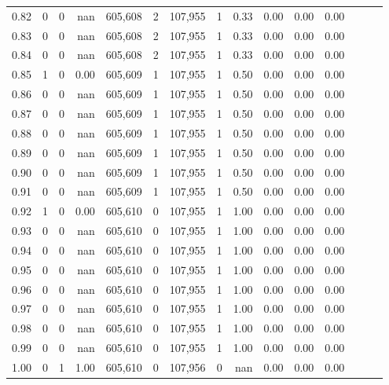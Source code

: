 \begin{tabular}{rrrrrrrrrrrrrrr}
0.82 &        0 &       0 &   nan &  605,608 &        2 &  107,955 &        1 &  0.33 &  0.00 &  0.00 &      0.00 \\
0.83 &        0 &       0 &   nan &  605,608 &        2 &  107,955 &        1 &  0.33 &  0.00 &  0.00 &      0.00 \\
0.84 &        0 &       0 &   nan &  605,608 &        2 &  107,955 &        1 &  0.33 &  0.00 &  0.00 &      0.00 \\
0.85 &        1 &       0 &  0.00 &  605,609 &        1 &  107,955 &        1 &  0.50 &  0.00 &  0.00 &      0.00 \\
0.86 &        0 &       0 &   nan &  605,609 &        1 &  107,955 &        1 &  0.50 &  0.00 &  0.00 &      0.00 \\
0.87 &        0 &       0 &   nan &  605,609 &        1 &  107,955 &        1 &  0.50 &  0.00 &  0.00 &      0.00 \\
0.88 &        0 &       0 &   nan &  605,609 &        1 &  107,955 &        1 &  0.50 &  0.00 &  0.00 &      0.00 \\
0.89 &        0 &       0 &   nan &  605,609 &        1 &  107,955 &        1 &  0.50 &  0.00 &  0.00 &      0.00 \\
0.90 &        0 &       0 &   nan &  605,609 &        1 &  107,955 &        1 &  0.50 &  0.00 &  0.00 &      0.00 \\
0.91 &        0 &       0 &   nan &  605,609 &        1 &  107,955 &        1 &  0.50 &  0.00 &  0.00 &      0.00 \\
0.92 &        1 &       0 &  0.00 &  605,610 &        0 &  107,955 &        1 &  1.00 &  0.00 &  0.00 &      0.00 \\
0.93 &        0 &       0 &   nan &  605,610 &        0 &  107,955 &        1 &  1.00 &  0.00 &  0.00 &      0.00 \\
0.94 &        0 &       0 &   nan &  605,610 &        0 &  107,955 &        1 &  1.00 &  0.00 &  0.00 &      0.00 \\
0.95 &        0 &       0 &   nan &  605,610 &        0 &  107,955 &        1 &  1.00 &  0.00 &  0.00 &      0.00 \\
0.96 &        0 &       0 &   nan &  605,610 &        0 &  107,955 &        1 &  1.00 &  0.00 &  0.00 &      0.00 \\
0.97 &        0 &       0 &   nan &  605,610 &        0 &  107,955 &        1 &  1.00 &  0.00 &  0.00 &      0.00 \\
0.98 &        0 &       0 &   nan &  605,610 &        0 &  107,955 &        1 &  1.00 &  0.00 &  0.00 &      0.00 \\
0.99 &        0 &       0 &   nan &  605,610 &        0 &  107,955 &        1 &  1.00 &  0.00 &  0.00 &      0.00 \\
1.00 &        0 &       1 &  1.00 &  605,610 &        0 &  107,956 &        0 &   nan &  0.00 &  0.00 &      0.00 \\
\bottomrule
\end{tabular}

